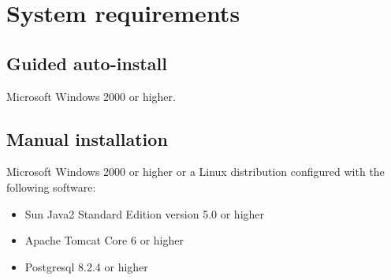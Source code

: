 \section{System requirements}
\subsection{Guided auto-install}
Microsoft Windows 2000 or higher.
\subsection{Manual installation}
Microsoft Windows 2000 or higher or a Linux distribution configured with the following software:
\begin{itemize}
\item Sun Java2 Standard Edition version 5.0 or higher
\item Apache Tomcat Core 6 or higher
\item Postgresql 8.2.4 or higher
\end{itemize}
